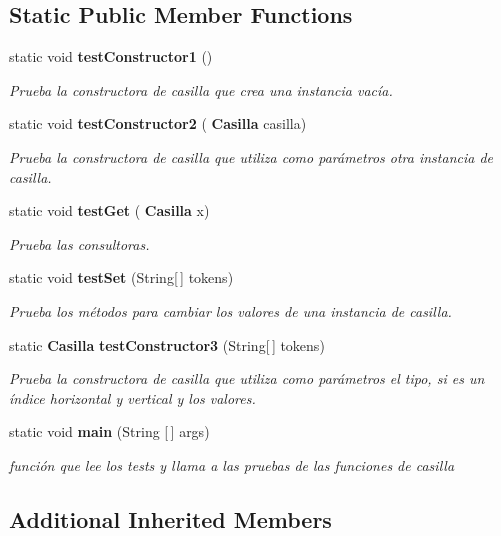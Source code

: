 \subsection*{Static Public Member Functions}
\begin{DoxyCompactItemize}
\item 
static void \textbf{ test\+Constructor1} ()
\begin{DoxyCompactList}\small\item\em Prueba la constructora de casilla que crea una instancia vacía. \end{DoxyCompactList}\item 
static void \textbf{ test\+Constructor2} (\textbf{ Casilla} casilla)
\begin{DoxyCompactList}\small\item\em Prueba la constructora de casilla que utiliza como parámetros otra instancia de casilla. \end{DoxyCompactList}\item 
static void \textbf{ test\+Get} (\textbf{ Casilla} x)
\begin{DoxyCompactList}\small\item\em Prueba las consultoras. \end{DoxyCompactList}\item 
static void \textbf{ test\+Set} (String[$\,$] tokens)
\begin{DoxyCompactList}\small\item\em Prueba los métodos para cambiar los valores de una instancia de casilla. \end{DoxyCompactList}\item 
static \textbf{ Casilla} \textbf{ test\+Constructor3} (String[$\,$] tokens)
\begin{DoxyCompactList}\small\item\em Prueba la constructora de casilla que utiliza como parámetros el tipo, si es un índice horizontal y vertical y los valores. \end{DoxyCompactList}\item 
static void \textbf{ main} (String [$\,$] args)
\begin{DoxyCompactList}\small\item\em función que lee los tests y llama a las pruebas de las funciones de casilla \end{DoxyCompactList}\end{DoxyCompactItemize}
\subsection*{Additional Inherited Members}


